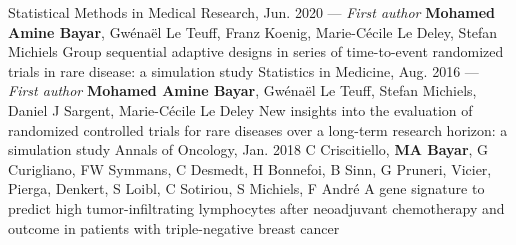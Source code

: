 \vspace*{.5em}
\begin{projects}
\paper
{Statistical Methods in Medical Research, Jun. 2020 --- \textit{First author}}
{}
{\textbf{Mohamed Amine Bayar}, Gw\'{e}na\"{e}l Le Teuff, Franz Koenig, Marie-C\'{e}cile Le Deley, Stefan Michiels}
{Group sequential adaptive designs in series of time-to-event randomized trials in rare disease: a simulation study}
\paper
{Statistics in Medicine, Aug. 2016 --- \textit{First author}}
{}
{\textbf{Mohamed Amine Bayar}, Gw\'{e}na\"{e}l Le Teuff, Stefan Michiels, Daniel J Sargent, Marie-C\'{e}cile Le Deley}
{New insights into the evaluation of randomized controlled trials for rare diseases over a long-term research horizon: a simulation study}
\paper
{Annals of Oncology, Jan. 2018}
{}
{C Criscitiello, \textbf{MA Bayar}, G Curigliano, FW Symmans, C Desmedt, H Bonnefoi, B Sinn, G Pruneri, Vicier, Pierga, Denkert, S Loibl, C Sotiriou, S Michiels, F André}
{A gene signature to predict high tumor-infiltrating lymphocytes after neoadjuvant chemotherapy and outcome in patients with triple-negative breast cancer}

\end{projects}
